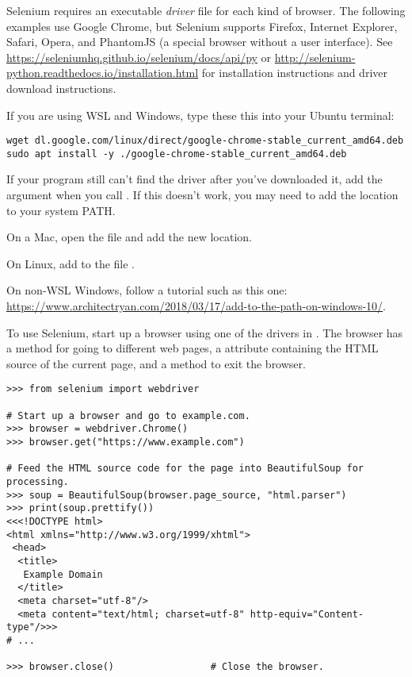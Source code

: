 \begin{info} %
Selenium requires an executable \emph{driver} file for each kind of browser.
The following examples use Google Chrome, but Selenium supports Firefox, Internet Explorer, Safari, Opera, and PhantomJS (a special browser without a user interface).
See \url{https://seleniumhq.github.io/selenium/docs/api/py} or \url{http://selenium-python.readthedocs.io/installation.html} for installation instructions and driver download instructions.

If you are using WSL and Windows, type these this into your Ubuntu terminal:
\begin{lstlisting}
wget dl.google.com/linux/direct/google-chrome-stable_current_amd64.deb
sudo apt install -y ./google-chrome-stable_current_amd64.deb
\end{lstlisting}

If your program still can't find the driver after you've downloaded it, add the argument  when you call .
If this doesn't work, you may need to add the location to your system PATH.

On a Mac, open the file  and add the new location.

On Linux, add  to the file  .

On non-WSL Windows, follow a tutorial such as this one: \url{https://www.architectryan.com/2018/03/17/add-to-the-path-on-windows-10/}.

\end{info}

To use Selenium, start up a browser using one of the drivers in .
The browser has a  method for going to different web pages, a  attribute containing the HTML source of the current page, and a  method to exit the browser.

\begin{lstlisting}
>>> from selenium import webdriver

# Start up a browser and go to example.com.
>>> browser = webdriver.Chrome()
>>> browser.get("https://www.example.com")

# Feed the HTML source code for the page into BeautifulSoup for processing.
>>> soup = BeautifulSoup(browser.page_source, "html.parser")
>>> print(soup.prettify())
<<<!DOCTYPE html>
<html xmlns="http://www.w3.org/1999/xhtml">
 <head>
  <title>
   Example Domain
  </title>
  <meta charset="utf-8"/>
  <meta content="text/html; charset=utf-8" http-equiv="Content-type"/>>>
# ...

>>> browser.close()                 # Close the browser.
\end{lstlisting}


